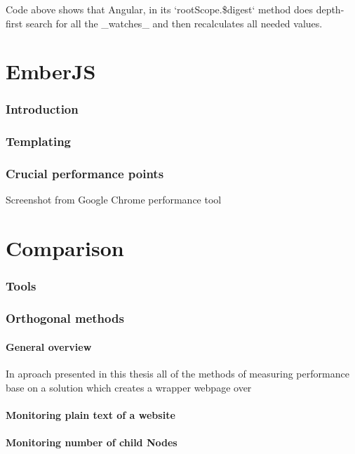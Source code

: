 \documentclass[inzynier,druk,ramka]{build/dyplom}
\begin{document}
Code above shows that Angular, in its `rootScope.\$digest` method does depth-first search for all the \_watches\_ and then recalculates all needed values.

\chapter{EmberJS}

\subsection{Introduction}

\subsection{Templating}

\subsection{Crucial performance points}

Screenshot from Google Chrome performance tool

\chapter{Comparison}

\subsection{Tools}

\subsection{Orthogonal methods}

\subsubsection {General overview}

In aproach presented in this thesis all of the methods of measuring performance base on a solution which creates a wrapper webpage over

\subsubsection{Monitoring plain text of a website}

\subsubsection{Monitoring number of child Nodes}
\end{document}
